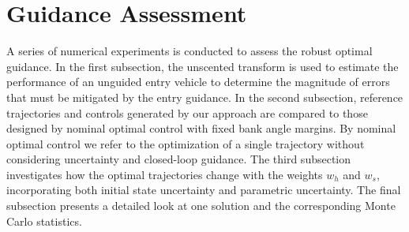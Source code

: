 \documentclass[journal ]{new-aiaa}
\begin{document}
\section*{Guidance Assessment}
A series of numerical experiments is conducted to assess the robust optimal guidance. In the first subsection, the unscented transform is used to estimate the performance of an unguided entry vehicle to determine the magnitude of errors that must be mitigated by the entry guidance. In the second subsection, reference trajectories and controls generated by our approach are compared to those designed by nominal optimal control with fixed bank angle margins. By nominal optimal control we refer to the optimization of a single trajectory without considering uncertainty and closed-loop guidance. The third subsection investigates how the optimal trajectories change with the weights $w_h$ and $w_s$, incorporating both initial state uncertainty and parametric uncertainty. The final subsection presents a detailed look at one solution and the corresponding Monte Carlo statistics.
\end{document}
